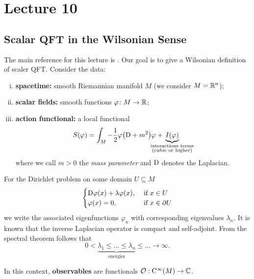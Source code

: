 \chapter{Lecture 10}

\section{Scalar QFT in the Wilsonian Sense}

The main reference for this lecture is \cite[Sections 1.1 to 1.5 and 2.1 to 2.7]{CosRenormalization11}.
Our goal is to give a Wilsonian definition of scaler QFT. Consider the data:
\begin{enumerate}[i)]
  \item \textbf{spacetime:} smooth Riemannian manifold $M$ (we consider $M = \mathbb{R}^n$);
  \item \textbf{scalar fields:} smooth functions $ \varphi \colon M \to \mathbb{R}$;
  \item \textbf{action functional:} a local functional
  \begin{equation*}
    S(\varphi) = \int_M - \frac{1}{2} \varphi \bigl( \Drm + m^2 \bigr) \varphi 
    + \hspace{-7mm} \underbrace{I (\varphi)}_{\substack{
        \text{interactions terms} \\
        \text{(cubic or higher)}}}
  \end{equation*}
  where we call $m > 0$ the \textit{mass parameter} and $\mathrm{D}$ denotes the Laplacian.
\end{enumerate}

For the Dirichlet problem on some domain $U \subseteq M$
\begin{equation*}
  \begin{cases}
    \mathrm{D} \varphi(x) + \lambda \varphi(x), &\text{ if } x \in U \\
    \varphi(x) = 0, &\text{ if } x \in \partial U
  \end{cases}
\end{equation*}
we write the associated eigenfunctions $\varphi_n$ with corresponding eigenvalues $\lambda_n$.
It is known that the inverse Laplacian operator is compact and self-adjoint. From the spectral theorem follows that
\begin{equation*}
  0 < 
  \underbrace{\lambda_1 \leq \dots \leq \lambda_n}_{\text{energies}}
  \leq \dots \longrightarrow \infty.
\end{equation*}

In this context, \textbf{observables} are functionals $\mathcal{O} : \mathrm{C}^\infty (M) \to \mathbb{C}$.

